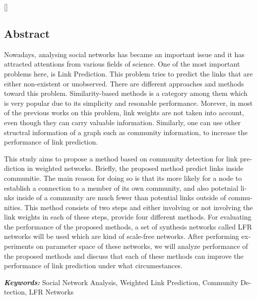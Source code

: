 \newpage
{}[]
\begin{latin}
\section*{Abstract}
\setlength{\parindent}{2em}
\setlength{\parskip}{1em}
Nowadays, analysing social networks has became an important issue and it has attracted attentions from various fields of science. One of the most important problems here, is Link Prediction. This problem tries to predict the links that are either non-existent or unobserved. There are different approaches and methods toward this problem. Similarity-based methods is a category among them which is very popular due to its simplicity and resonable performance. Morever, in most of the previous works on this problem, link weights are not taken into account, even though they can carry valuable information. Similarly, one can use other structral information of a graph such as community information, to increase the performance of link prediction.

This study aims to propose a method based on community detection for link prediction in weighted networks. Briefly, the proposed method predict links inside communitie. The main reason for doing so is that its more likely for a node to establish a connection to a member of its own community, and also potetnial links inside of a community are much fewer than potential links outside of communities. This method consists of two steps and either involving or not involving the link weights in each of these steps, provide four different methods. For evaluating the performance of the proposed methods, a set of synthesis networks called LFR networks will be used which are kind of scale-free networks. After performing experiments on parameter space of these networks, we will analyze performance of the proposed methods and discuss that each of these methods can improve the performance of link prediction under what circumestances.

\textbf{\textit{Keywords: }}
{\small Social Network Analysis, Weighted Link Prediction, Community Detection, LFR Networks}
\end{latin}
\newpage\null\thispagestyle{empty}\newpage
